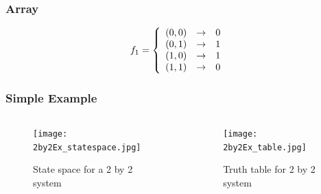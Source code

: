 \documentclass{beamer}
\begin{document}
\begin{frame}
 \frametitle{Array}
\begin{equation}
                f_1 = \left\{
                \begin{array}{l l l}
                (0,0) & \rightarrow & 0\\
                (0,1) & \rightarrow & 1\\
                (1,0) & \rightarrow & 1\\
                (1,1) & \rightarrow & 0\\
                \end{array} \right.
\end{equation}
\end{frame}

\begin{frame}
	\frametitle{Simple Example}
\begin{columns}
  \begin{column}[l]{0.5\textwidth}
	\begin{figure}
		\centering
		\texttt{[image: 2by2Ex\_statespace.jpg]}
		\caption{State space for a 2 by 2 system}
	\end{figure}
	\end{column}
	
	\begin{column}[r]{0.5\textwidth}
	\begin{figure}
 		\centering
		\texttt{[image: 2by2Ex\_table.jpg]}
		\caption{Truth table for 2 by 2 system}
	\end{figure}
	\end{column}
\end{columns}
\end{frame}
\end{document}
